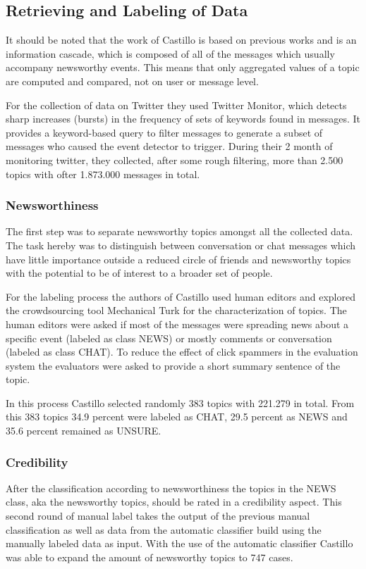 \documentclass{proseminar}
\let\i\undefined
\newcommand{\i}[1]{\emph{#1}}
\begin{document}

\subsection{Retrieving and Labeling of Data}
It should be noted that the work of Castillo \i{et al.} is based on previous works and is an information cascade, which is composed of all of the messages which usually accompany newsworthy events. This means that only aggregated values of a topic are computed and compared, not on user or message level.

For the collection of data on Twitter they used Twitter Monitor\cite{twittermonitor}, which detects sharp increases (bursts) in the frequency of sets of keywords found in messages. It provides a keyword-based query to filter messages to generate a subset of messages who caused the event detector to trigger.
During their 2 month of monitoring twitter, they collected, after some rough filtering, more than 2.500 topics with ofter 1.873.000 messages in total.

\subsubsection*{Newsworthiness}
The first step was to  separate newsworthy topics amongst all the collected data. The task hereby was to distinguish between conversation or chat messages which have little importance outside a reduced circle of friends and newsworthy topics with the potential to be of interest to a broader set of people.

For the labeling process the authors of Castillo \i{et al.} used human editors and explored the crowdsourcing tool Mechanical Turk for the characterization of topics.
The human editors were asked if most of the messages were spreading news about a specific event (labeled as class NEWS) or mostly comments or conversation (labeled as class CHAT). To  reduce the effect of click spammers in the evaluation system the evaluators were asked to provide a short summary sentence of the topic.

In this process Castillo \i{et al.} selected randomly 383 topics with 221.279 in total. From this 383 topics 34.9 percent were labeled as CHAT, 29.5 percent as NEWS and 35.6 percent remained as UNSURE.


\subsubsection*{Credibility}
After the classification according to newsworthiness the topics in the NEWS class, aka the newsworthy topics, should be rated in a credibility aspect.
This second round of manual label takes the output of the previous manual classification as well as data from the automatic classifier build using the manually labeled data as input. With the use of the automatic classifier Castillo \i{et al.} was able to expand the amount of newsworthy topics to 747 cases.
\end{document}
